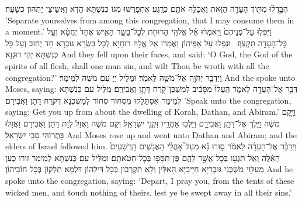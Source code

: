 {הִבָּ֣דְל֔וּ מִתּ֖וֹךְ הָעֵדָ֣ה הַזֹּ֑את וַאֲכַלֶּ֥ה אֹתָ֖ם כְּרָֽגַע׃}
{אִתְפָּרַשׁוּ מִגּוֹ כְּנִשְׁתָּא הָדָא וַאֲשֵׁיצֵי יָתְהוֹן כְּשָׁעָה׃}
{’Separate yourselves from among this congregation, that I may consume them in a moment.’}{}
{וַיִּפְּל֤וּ עַל־פְּנֵיהֶם֙ וַיֹּ֣אמְר֔וּ אֵ֕ל אֱלֹהֵ֥י הָרוּחֹ֖ת לְכׇל־בָּשָׂ֑ר הָאִ֤ישׁ אֶחָד֙ יֶחֱטָ֔א וְעַ֥ל כׇּל־הָעֵדָ֖ה תִּקְצֹֽף׃ \setuma 
{}}
{וּנְפַלוּ עַל אַפֵּיהוֹן וַאֲמַרוּ אֵל אֱלָהּ רוּחַיָּא לְכָל בִּשְׂרָא גּוּבְרָא חַד יְחוּב וְעַל כָּל כְּנִשְׁתָּא יְהֵי רוּגְזָא׃}
{And they fell upon their faces, and said: ‘O God, the God of the spirits of all flesh, shall one man sin, and wilt Thou be wroth with all the congregation?’}{}
{וַיְדַבֵּ֥ר יְהֹוָ֖ה אֶל־מֹשֶׁ֥ה לֵּאמֹֽר׃}
{וּמַלֵּיל יְיָ עִם מֹשֶׁה לְמֵימַר׃}
{And the \lord\space spoke unto Moses, saying:}{}
{דַּבֵּ֥ר אֶל־הָעֵדָ֖ה לֵאמֹ֑ר הֵֽעָלוּ֙ מִסָּבִ֔יב לְמִשְׁכַּן־קֹ֖רַח דָּתָ֥ן וַאֲבִירָֽם׃
}
{מַלֵּיל עִם כְּנִשְׁתָּא לְמֵימַר אִסְתַּלַּקוּ מִסְּחוֹר סְחוֹר לְמַשְׁכְּנָא דְּקֹרַח דָּתָן וַאֲבִירָם׃}
{’Speak unto the congregation, saying: Get you up from about the dwelling of Korah, Dathan, and Abiram.’}{}
{וַיָּ֣קׇם מֹשֶׁ֔ה וַיֵּ֖לֶךְ אֶל־דָּתָ֣ן וַאֲבִירָ֑ם וַיֵּלְכ֥וּ אַחֲרָ֖יו זִקְנֵ֥י יִשְׂרָאֵֽל׃
}
{וְקָם מֹשֶׁה וַאֲזַל לְוָת דָּתָן וַאֲבִירָם וַאֲזַלוּ בָּתְרוֹהִי סָבֵי יִשְׂרָאֵל׃}
{And Moses rose up and went unto Dathan and Abiram; and the elders of Israel followed him.}{}
{וַיְדַבֵּ֨ר אֶל־הָעֵדָ֜ה לֵאמֹ֗ר ס֣וּרוּ נָ֡א מֵעַל֩ אׇהֳלֵ֨י הָאֲנָשִׁ֤ים הָֽרְשָׁעִים֙ הָאֵ֔לֶּה וְאַֽל־תִּגְּע֖וּ בְּכׇל־אֲשֶׁ֣ר לָהֶ֑ם פֶּן־תִּסָּפ֖וּ בְּכׇל־חַטֹּאתָֽם׃}
{וּמַלֵּיל עִם כְּנִשְׁתָּא לְמֵימַר זוּרוּ כְעַן מֵעִלָּוֵי מַשְׁכְּנֵי גּוּבְרַיָּא חַיָּיבַיָּא הָאִלֵּין וְלָא תִקְרְבוּן בְּכָל דִּילְהוֹן דִּלְמָא תִלְקוֹן בְּכָל חוֹבֵיהוֹן׃}
{And he spoke unto the congregation, saying: ‘Depart, I pray you, from the tents of these wicked men, and touch nothing of theirs, lest ye be swept away in all their sins.’}{}
